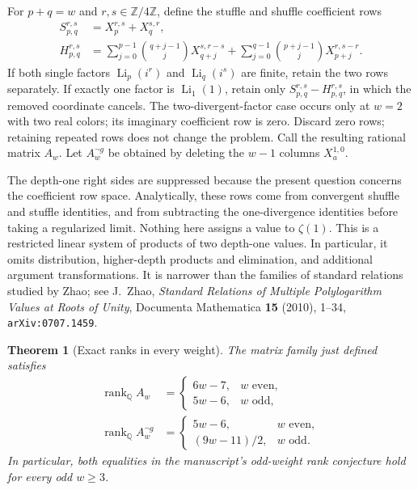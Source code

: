 \documentclass[11pt,a4paper]{article}
\newtheorem{theorem}{Theorem}[section]
\theoremstyle{definition}
\theoremstyle{remark}
\numberwithin{equation}{section}
\begin{document}
For $p+q=w$ and $r,s\in\mathbb Z/4\mathbb Z$, define the stuffle and
shuffle coefficient rows
\begin{align}
 S_{p,q}^{r,s}
 &=X_p^{r,s}+X_q^{s,r},\\
 H_{p,q}^{r,s}
 &=\sum_{j=0}^{p-1}\binom{q+j-1}{j}X_{q+j}^{s,r-s}
   +\sum_{j=0}^{q-1}\binom{p+j-1}{j}X_{p+j}^{r,s-r}.
 \label{fg:eq:raw-rows}
\end{align}
If both single factors $\operatorname{Li}_p(i^r)$ and
$\operatorname{Li}_q(i^s)$ are finite, retain the two rows separately.
If exactly one factor is $\operatorname{Li}_1(1)$, retain only
$S_{p,q}^{r,s}-H_{p,q}^{r,s}$, in which the removed coordinate cancels.
The two-divergent-factor case occurs only at $w=2$ with two real colors;
its imaginary coefficient row is zero. Discard zero rows; retaining
repeated rows does not change the problem. Call the resulting rational
matrix $A_w$. Let $A_w^{\neg g}$ be obtained by deleting the $w-1$
columns $X_a^{1,0}$.

The depth-one right sides are suppressed because the present question
concerns the coefficient row space. Analytically, these rows come from
convergent shuffle and stuffle identities, and from subtracting the
one-divergence identities before taking a regularized limit. Nothing
here assigns a value to $\zeta(1)$. This is a restricted linear system
of products of two depth-one values. In particular, it omits distribution,
higher-depth products and elimination, and additional argument
transformations. It is narrower than the families of standard relations
studied by Zhao; see J.~Zhao, \emph{Standard Relations of Multiple
Polylogarithm Values at Roots of Unity}, Documenta Mathematica
\textbf{15} (2010), 1--34, \texttt{arXiv:0707.1459}.

\begin{theorem}[Exact ranks in every weight]\label{fg:thm:rank}
The matrix family just defined satisfies
\begin{align}
 \operatorname{rank}_{\mathbb Q}A_w
 &=\begin{cases}
      6w-7,&w\text{ even},\\
      5w-6,&w\text{ odd},
    \end{cases}\label{fg:eq:full-rank}\\
 \operatorname{rank}_{\mathbb Q}A_w^{\neg g}
 &=\begin{cases}
      5w-6,&w\text{ even},\\
      (9w-11)/2,&w\text{ odd}.
    \end{cases}\label{fg:eq:nong-rank}
\end{align}
In particular, both equalities in the manuscript's odd-weight rank
conjecture hold for every odd $w\ge3$.
\end{theorem}
\end{document}
